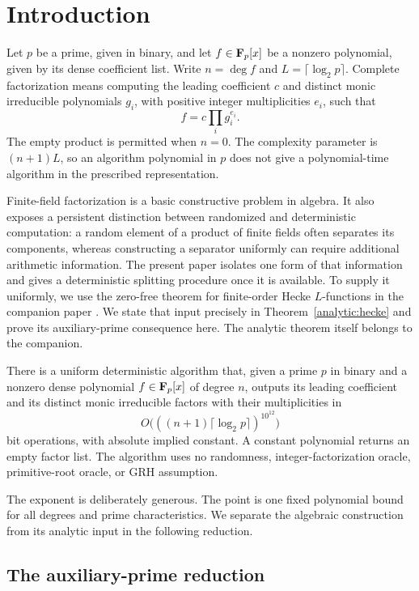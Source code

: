 \section{Introduction}\label{sec:introduction}

Let $p$ be a prime, given in binary, and let $f\in\mathbf F_p[x]$ be a
nonzero polynomial, given by its dense coefficient list. Write
$n=\deg f$ and $L=\lceil\log_2 p\rceil$. Complete factorization means
computing the leading coefficient $c$ and distinct monic irreducible
polynomials $g_i$, with positive integer multiplicities $e_i$, such that
\[
 f=c\prod_i g_i^{e_i}.
\]
The empty product is permitted when $n=0$. The complexity parameter is
$(n+1)L$, so an algorithm polynomial in $p$ does not give a polynomial-time
algorithm in the prescribed representation.

Finite-field factorization is a basic constructive problem in algebra.
It also exposes a persistent distinction between randomized and
deterministic computation: a random element of a product of finite fields
often separates its components, whereas constructing a separator uniformly
can require additional arithmetic information. The present paper isolates
one form of that information and gives a deterministic splitting procedure
once it is available. To supply it uniformly, we use the zero-free theorem
for finite-order Hecke $L$-functions in the companion paper
\cite[Theorem~1.2]{OpenAIPrimitive26}. We state that input precisely in
Theorem~\ref{analytic:hecke} and prove its auxiliary-prime consequence
here. The analytic theorem itself belongs to the companion.

\begin{theorem}\label{thm:factorization}
There is a uniform deterministic algorithm that, given a prime $p$ in
binary and a nonzero dense polynomial $f\in\mathbf F_p[x]$ of degree $n$, outputs
its leading coefficient and its distinct monic irreducible factors with
their multiplicities in
\[
 O\bigl(((n+1)\lceil\log_2p\rceil)^{10^{12}}\bigr)
\]
bit operations, with absolute implied constant. A constant polynomial
returns an empty factor list. The algorithm uses no randomness,
integer-factorization oracle, primitive-root oracle, or GRH assumption.
\end{theorem}

The exponent is deliberately generous. The point is one fixed polynomial
bound for all degrees and prime characteristics. We separate the
algebraic construction from its analytic input in the following reduction.

\subsection{The auxiliary-prime reduction}

